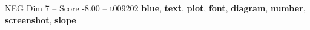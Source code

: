 \begin{textsample}{NEG Dim 7 – Score -8.00 – t009202}  \label{ex:f7_neg_008}
\textbf{blue}, \textbf{text}, \textbf{plot}, \textbf{font}, \textbf{diagram}, \textbf{number}, \textbf{screenshot}, \textbf{slope}

\end{textsample}
